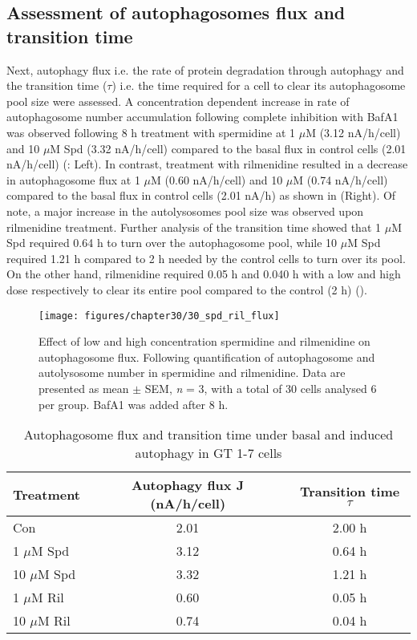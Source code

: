 {\subsection{Assessment of autophagosomes flux and transition time}
Next, autophagy flux i.e. the rate of protein degradation through autophagy \citep{klionsky2016,loos2014} and the transition time ($\tau$) i.e. the time required for a cell to clear its autophagosome pool size \citep{DuToit2018b,loos2014} were assessed. A concentration dependent increase in rate of autophagosome number accumulation following complete inhibition with BafA1 was observed following 8 h treatment with spermidine at 1 $\mu$M (3.12 nA/h/cell) and 10 $\mu$M Spd (3.32 nA/h/cell) compared to the basal flux in control cells (2.01 nA/h/cell) (: Left). In contrast, treatment with rilmenidine resulted in a decrease in autophagosome flux at 1 $\mu$M (0.60 nA/h/cell) and 10 $\mu$M (0.74 nA/h/cell) compared to the basal flux in control cells (2.01 nA/h) as shown in  (Right). Of note, a major increase in the autolysosomes pool size was observed upon rilmenidine treatment. Further analysis of the transition time showed that 1 $\mu$M Spd required 0.64 h to turn over the autophagosome pool, while 10 $\mu$M Spd required 1.21 h compared to 2 h needed by the control cells to turn over its pool. On the other hand, rilmenidine required 0.05 h and 0.040 h with a low and high dose respectively to clear its entire pool compared to the control (2 h) ().

\begin{figure}[!htbp]
\center
  \texttt{[image: figures/chapter30/30\_spd\_ril\_flux]}
  \caption[Effect of low and high concentration spermidine and rilmenidine on autophagosome flux]{Effect of low and high concentration spermidine and rilmenidine on autophagosome flux. Following quantification of autophagosome and autolysosome number in spermidine and rilmenidine. Data are presented as mean $\pm$ SEM, \textit{n} = 3, with a total of 30 cells analysed 6 per group. BafA1 was added after 8 h.}
  \label{fig:30_spd_ril_flux}
\end{figure} 

\begin{table}[!htbp]
\centering
\caption[Autophagosome flux and transition time under basal and induced autophagy in GT 1-7 cells]{Autophagosome flux and transition time under basal and induced autophagy in GT 1-7 cells}
\label{tab:30_flux}
  \centering
  \begin{tabular}{lcc}
\toprule
Treatment & Autophagy flux J (nA/h/cell) & Transition time $\tau$\\
\midrule
Con & 2.01 & 2.00 h \\
1 $\mu$M Spd & 3.12 & 0.64 h \\
10 $\mu$M Spd & 3.32 & 1.21 h \\
1 $\mu$M Ril & 0.60 & 0.05 h \\
10 $\mu$M Ril & 0.74 & 0.04 h \\
\end{tabular}
\end{table}

}

